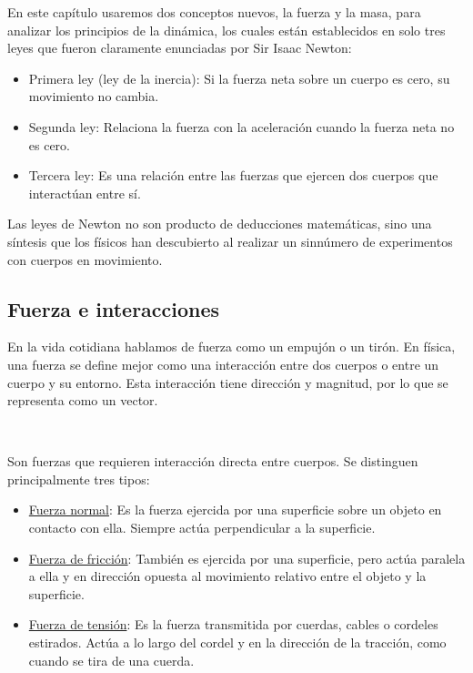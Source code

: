 \documentclass{article}
\newcommand{\newsubsection}[1]{
    \subsection{\color{sectionColor} #1}
}
\newcommand{\newtitle}[1]{
    \vspace{0.5cm}
    \noindent{\large \color{titleColor} \textbf{#1}}\\[0.2cm]
}
\begin{document}
\par En este capítulo usaremos dos conceptos nuevos, la fuerza y la masa, para analizar los principios de la dinámica, los cuales están establecidos en solo tres leyes que fueron claramente enunciadas por Sir Isaac Newton:

\begin{itemize}
    \item Primera ley (ley de la inercia): Si la fuerza neta sobre un cuerpo es cero, su movimiento no cambia.
    \item Segunda ley: Relaciona la fuerza con la aceleración cuando la fuerza neta no es cero.
    \item Tercera ley: Es una relación entre las fuerzas que ejercen dos cuerpos que interactúan entre sí.
\end{itemize}

\par Las leyes de Newton no son producto de deducciones matemáticas, sino una síntesis que los físicos han descubierto al realizar un sinnúmero de experimentos con cuerpos en movimiento.


    \newsubsection{Fuerza e interacciones}

        \par En la vida cotidiana hablamos de fuerza como un empujón o un tirón. En física, una fuerza se define mejor como una interacción entre dos cuerpos o entre un cuerpo y su entorno. Esta interacción tiene dirección y magnitud, por lo que se representa como un vector.

    \newtitle{Fuerzas de contacto}

        \par Son fuerzas que requieren interacción directa entre cuerpos. Se distinguen principalmente tres tipos:

        \begin{itemize}
            \item \underline{Fuerza normal}: Es la fuerza ejercida por una superficie sobre un objeto en contacto con ella. Siempre actúa perpendicular a la superficie.
            \item \underline{Fuerza de fricción}: También es ejercida por una superficie, pero actúa paralela a ella y en dirección opuesta al movimiento relativo entre el objeto y la superficie.
            \item \underline{Fuerza de tensión}: Es la fuerza transmitida por cuerdas, cables o cordeles estirados. Actúa a lo largo del cordel y en la dirección de la tracción, como cuando se tira de una cuerda.
        \end{itemize}
\end{document}
